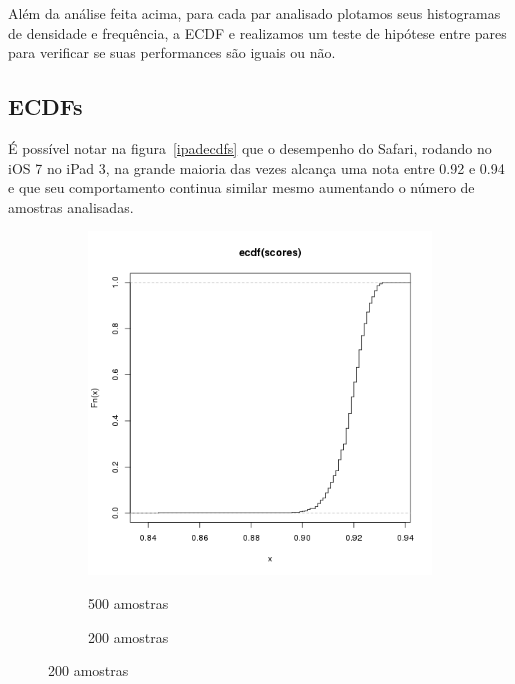 \documentclass[11pt,a4paper]{article}
\begin{document}
Além da análise feita acima, para cada par analisado plotamos seus histogramas de densidade e frequência, a ECDF e realizamos um teste de hipótese
entre pares para verificar se suas performances são iguais ou não.

\subsection{ECDFs}\label{ecdfs}

É possível notar na figura~\ref{ipadecdfs} que o desempenho do Safari, rodando no iOS 7 no iPad 3, na grande maioria das
vezes alcança uma nota entre 0.92 e 0.94 e que seu comportamento continua similar mesmo aumentando o número de amostras
analisadas.

\begin{figure}[H]
    \caption{ECDFs - iPad 3 Safari}
    \label{ipadecdfs}
    \begin{subfigure}{.5\textwidth}
        \caption{500 amostras}
        \centering
        \includegraphics[width=\textwidth]{images/ecdf-ipad-3-ios7-safari-500-amostras-20131119}
        \label{safari500}
    \end{subfigure}
    \begin{subfigure}{.5\textwidth}
        \caption{200 amostras}
        \centering

\end{subfigure}
\end{figure}
\end{document}
